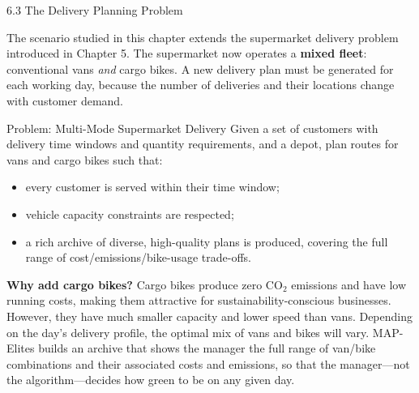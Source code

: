 \documentclass[aspectratio=169,10pt]{beamer}
\begin{document}
\begin{frame}[allowframebreaks]{6.3 The Delivery Planning Problem}

The scenario studied in this chapter extends the supermarket delivery
problem introduced in Chapter 5.
The supermarket now operates a \textbf{mixed fleet}: conventional vans
\emph{and} cargo bikes.
A new delivery plan must be generated for each working day, because
the number of deliveries and their locations change with customer
demand.

\medskip
\begin{block}{Problem: Multi-Mode Supermarket Delivery}
Given a set of customers with delivery time windows and quantity
requirements, and a depot, plan routes for vans and cargo bikes such
that:
\begin{itemize}
  \item every customer is served within their time window;
  \item vehicle capacity constraints are respected;
  \item a rich archive of diverse, high-quality plans is produced,
        covering the full range of cost/emissions/bike-usage trade-offs.
\end{itemize}
\end{block}

\medskip
\textbf{Why add cargo bikes?}
Cargo bikes produce zero CO$_2$ emissions and have low running costs,
making them attractive for sustainability-conscious businesses.
However, they have much smaller capacity and lower speed than vans.
Depending on the day's delivery profile, the optimal mix of vans
and bikes will vary.
MAP-Elites builds an archive that shows the manager the full range
of van/bike combinations and their associated costs and emissions,
so that the manager---not the algorithm---decides how green to be
on any given day.

\end{frame}
\end{document}

